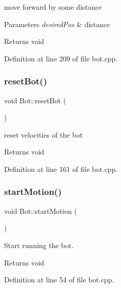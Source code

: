 move forward by some distance 


\begin{DoxyParams}{Parameters}
{\em desired\+Pos} & distance \\
\hline
\end{DoxyParams}
\begin{DoxyReturn}{Returns}
void 
\end{DoxyReturn}


Definition at line 209 of file bot.\+cpp.

\mbox{\label{class_bot_aeae87db5fd2d6a130587f665e39a6557}} 
\subsubsection{\texorpdfstring{reset\+Bot()}{resetBot()}}
{\footnotesize\ttfamily void Bot\+::reset\+Bot (\begin{DoxyParamCaption}{ }\end{DoxyParamCaption})}



reset velocities of the bot 

\begin{DoxyReturn}{Returns}
void 
\end{DoxyReturn}


Definition at line 161 of file bot.\+cpp.

\mbox{\label{class_bot_a5c1f98ef7f22894832865c5987d184c3}} 
\subsubsection{\texorpdfstring{start\+Motion()}{startMotion()}}
{\footnotesize\ttfamily void Bot\+::start\+Motion (\begin{DoxyParamCaption}{ }\end{DoxyParamCaption})}



Start running the bot. 

\begin{DoxyReturn}{Returns}
void 
\end{DoxyReturn}


Definition at line 54 of file bot.\+cpp.

\mbox{\label{class_bot_a6f9bf5628c1faedb8da493b381ba95ac}} 
